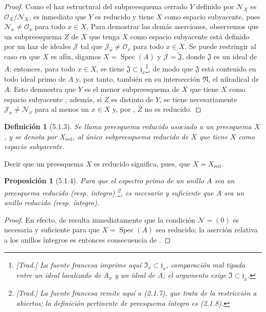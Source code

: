 \documentclass[oneside]{amsart}
\theoremstyle{ega-env-style}
\theoremstyle{ega-thm-env-style}
\newtheorem*{proposition}{Proposición}
\theoremstyle{ega-defn-env-style}
\newtheorem*{definition}{Definición}
\let\EGAOriginalLabel\label
\renewcommand{\label}[1]{\phantomsection\EGAOriginalLabel{#1}}
\begin{document}
\begin{proof}
Como el haz estructural del subpreesquema cerrado $Y$ definido por $\mathscr{N}_X$ es $\mathscr{O}_X/\mathscr{N}_X$, es inmediato que $Y$ es reducido y tiene $X$ como espacio subyacente, pues $\mathscr{N}_x\ne\mathscr{O}_x$ para todo $x\in X$.
Para demostrar las demás aserciones, observemos que un subpreesquema $Z$ de $X$ que tenga $X$ como espacio subyacente está definido por un haz de ideales $\mathscr{J}$  tal que $\mathscr{J}_x\ne\mathscr{O}_x$ para todo $x\in X$.
Se puede restringir al caso en que $X$ es afín, digamos $X=\operatorname{Spec}(A)$ y $\mathscr{J}=\widetilde{\mathfrak{J}}$, donde $\mathfrak{J}$ es un ideal de $A$;
entonces, para todo $x\in X$, se tiene $\mathfrak{J}\subset\mathfrak{j}_x$\footnote{\emph{[Trad.] La fuente francesa imprime aquí $\mathfrak{I}_x\subset\mathfrak{j}_x$, comparación mal tipada entre un ideal localizado de $A_x$ y un ideal de $A$; el argumento exige $\mathfrak{I}\subset\mathfrak{j}_x$.}}, de modo que $\mathfrak{J}$ está contenido en todo ideal primo de $A$ y, por tanto, también en su intersección $\mathfrak{N}$, el nilradical de $A$.
Esto demuestra que $Y$ es el menor subpreesquema de $X$ que tiene $X$ como espacio subyacente ;
además, si $Z$ es distinto de $Y$, se tiene necesariamente $\mathscr{J}_x\ne\mathscr{N}_x$ para al menos un $x\in X$ y, por , $Z$ no es reducido.
\end{proof}

\begin{definition}[5.1.3]
\label{I.5.1.3}
Se llama preesquema reducido asociado a un preesquema $X$, y se denota por $X_{\mathrm{red}}$, al único subpreesquema reducido de $X$ que tiene $X$ como espacio subyacente.
\end{definition}

Decir que un preesquema $X$ es reducido significa, pues, que $X=X_{\mathrm{red}}$.

\begin{proposition}[5.1.4]
\label{I.5.1.4}
Para que el espectro primo de un anillo $A$ sea un preesquema reducido (\textup{resp.} íntegro) \footnote{\emph{[Trad.] La fuente francesa remite aquí a (2.1.7), que trata de la restricción a abiertos; la definición pertinente de preesquema íntegro es (2.1.8).}}, es necesario y suficiente que $A$ sea un anillo reducido (\textup{resp.} íntegro).
\end{proposition}

\begin{proof}
En efecto, de  resulta inmediatamente que la condición $\mathscr{N}=(0)$ es necesaria y suficiente para que $X=\operatorname{Spec}(A)$ sea reducido;
la aserción relativa a los anillos íntegros es entonces consecuencia de .
\end{proof}
\end{document}

